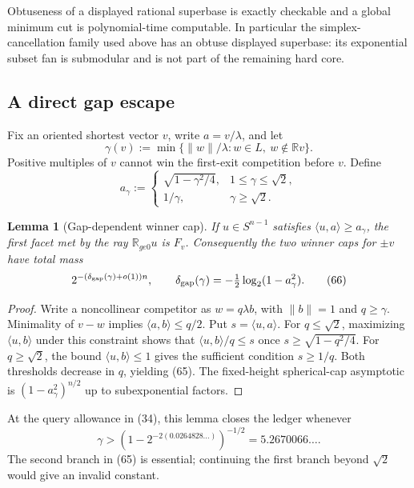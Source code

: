 \documentclass[10pt]{article}
\newtheorem{lemma}[theorem]{Lemma}
\theoremstyle{definition}
\newcommand{\R}{\mathbb{R}}
\newcommand{\ip}[2]{\langle #1,#2\rangle}
\newcommand{\norm}[1]{\lVert #1\rVert}
\begin{document}
Obtuseness of a displayed rational superbase is exactly checkable and a
global minimum cut is polynomial-time computable.  In particular the
simplex-cancellation family used above has an obtuse displayed superbase:
its exponential subset fan is submodular and is not part of the remaining
hard core.

\subsection{A direct gap escape}

Fix an oriented shortest vector $v$, write $a=v/\lambda$, and let
\[
 \gamma(v):=\min\{\norm w/\lambda:w\in L,\ w\notin\R v\}.       \tag{64}
\]
Positive multiples of $v$ cannot win the first-exit competition before $v$.
Define
\[
 a_\gamma:=
 \begin{cases}
  \sqrt{1-\gamma^2/4},&1\le\gamma\le\sqrt2,\\
  1/\gamma,&\gamma\ge\sqrt2.
 \end{cases}                                                    \tag{65}
\]

\begin{lemma}[Gap-dependent winner cap]                         \label{lem:gap-cap}
If $u\in S^{n-1}$ satisfies $\ip{u}{a}\ge a_\gamma$, the first facet met by
the ray $\R_{ge0}u$ is $F_v$.  Consequently the two winner caps for
$\pm v$ have total mass
\[
 2^{-(\delta_{\rm gap}(\gamma)+o(1))n},\qquad
 \delta_{\rm gap}(\gamma)
   =-\tfrac12\log_2(1-a_\gamma^2).                             \tag{66}
\]
\end{lemma}

\begin{proof}
Write a noncollinear competitor as $w=q\lambda b$, with $\norm b=1$ and
$q\ge\gamma$.  Minimality of $v-w$ implies $\ip{a}{b}\le q/2$.
Put $s=\ip{u}{a}$.  For $q\le\sqrt2$, maximizing $\ip{u}{b}$ under this constraint
shows that $\ip{u}{b}/q\le s$ once
$s\ge\sqrt{1-q^2/4}$.  For $q\ge\sqrt2$, the bound
$\ip{u}{b}\le1$ gives the sufficient condition $s\ge1/q$.  Both thresholds
decrease in $q$, yielding (65).  The fixed-height spherical-cap asymptotic is
$(1-a_\gamma^2)^{n/2}$ up to subexponential factors.
\end{proof}

At the query allowance in (34), this lemma closes the ledger whenever
\[
 \gamma>(1-2^{-2(0.0264828\ldots)})^{-1/2}
       =5.2670066\ldots.                                      \tag{67}
\]
The second branch in (65) is essential; continuing the first branch beyond
$\sqrt2$ would give an invalid constant.
\end{document}
